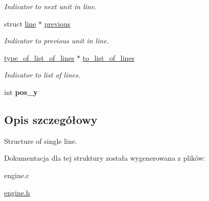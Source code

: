 \begin{DoxyCompactItemize}
\begin{DoxyCompactList}\small\item\em Indicator to next unit in line. \end{DoxyCompactList}\item 
\hypertarget{structline_abb721ad888ffdb866817db5b5afc033d}{struct \hyperlink{structline}{line} $\ast$ \hyperlink{structline_abb721ad888ffdb866817db5b5afc033d}{previous}}\label{structline_abb721ad888ffdb866817db5b5afc033d}

\begin{DoxyCompactList}\small\item\em Indicator to previous unit in line. \end{DoxyCompactList}\item 
\hypertarget{structline_ac189df255ed25ae802cf412f65a07e2a}{\hyperlink{structlist__of__lines}{type\-\_\-of\-\_\-list\-\_\-of\-\_\-lines} $\ast$ \hyperlink{structline_ac189df255ed25ae802cf412f65a07e2a}{to\-\_\-list\-\_\-of\-\_\-lines}}\label{structline_ac189df255ed25ae802cf412f65a07e2a}

\begin{DoxyCompactList}\small\item\em Indicator to list of lines. \end{DoxyCompactList}\item 
\hypertarget{structline_a08c960a770461edc09cca66dcaf9644c}{int {\bfseries pos\-\_\-y}}\label{structline_a08c960a770461edc09cca66dcaf9644c}

\end{DoxyCompactItemize}


\subsection{Opis szczegółowy}
Structure of single line. 

Dokumentacja dla tej struktury została wygenerowana z plików\-:\begin{DoxyCompactItemize}
\item 
engine.\-c\item 
\hyperlink{engine_8h}{engine.\-h}\end{DoxyCompactItemize}
